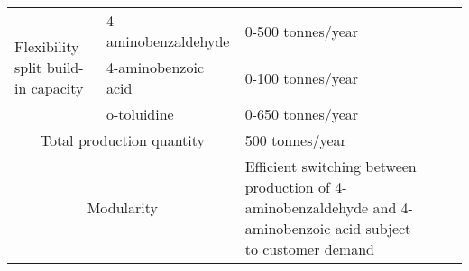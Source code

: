 \begin{table}[H]
\begin{tabularx}{\linewidth}{l|XXX|l}
\multirow{3}{*}{Flexibility split build-in capacity} & 4-aminobenzaldehyde & 0-500 tonnes/year                                                                                                                                                                                                                                                                                                                                                                                                                       \\ \cline{2-3} 
                                                     & 4-aminobenzoic acid & 0-100 tonnes/year                                                                                                                                                                                                                                                                                                                                                                                                                       \\ \cline{2-3} 
                                                     & o-toluidine         & 0-650 tonnes/year                                                                                                                                                                                                                                                                                                                                                                                                                       \\ \hline
\multicolumn{2}{|c|}{Total production quantity}                            & 500 tonnes/year                                                                                                                                                                                                                                                                                                                                                                                                                         \\ \hline
\multicolumn{2}{|c|}{Modularity}                                           & Efficient switching between production of 4-aminobenzaldehyde and 4-aminobenzoic acid subject to customer demand                                                                                                                                                                                                                                                                                                                        \\ \hline

\end{tabularx}
\end{table}
